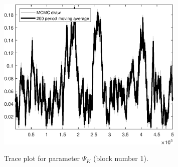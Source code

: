 \begin{figure}[H]
\centering
  \includegraphics[width=0.8\textwidth]{BRS_growth_ext_fd/graphs/TracePlot_Psi_K_blck_1}\\
    \caption{Trace plot for parameter ${\Psi_K}$ (block number 1).}
\end{figure}
